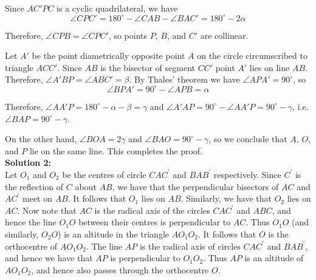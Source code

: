 \documentclass[a4paper, 12pt]{article}
\begin{document}
\begin{enumerate}
	Since $AC'PC$ is a cyclic quadrilateral, we have
	$$ \angle CPC' = 180^\circ - \angle CAB - \angle BAC' = 180^\circ - 2 \alpha $$
	
	Therefore, $\angle CPB = \angle CPC'$, so points $P$, $B$, and $C'$ are collinear.
	
	Let $A'$ be the point diametrically opposite point $A$ on the circle circumscribed to triangle $ACC'$. Since $AB$ is the bisector of segment $\overline{CC'}$ point $A'$ lies on line $AB$. Therefore, $\angle A'BP = \angle ABC' = \beta$. By Thales' theorem we have $\angle APA' = 90^\circ$, so
	$$ \angle BPA' = 90^\circ - \angle APB = \alpha $$
	
	Therefore, $\angle AA'P = 180^\circ - \alpha - \beta = \gamma$ and $\angle A'AP = 90^\circ - \angle AA'P = 90^\circ - \gamma$, i.e. $\angle BAP = 90^\circ - \gamma$.
	
	On the other hand, $\angle BOA = 2\gamma$ and $\angle BAO = 90^\circ - \gamma$, so we conclude that $A$, $O$, and $P$ lie on the same line. This completes the proof. \\

\textbf{Solution 2:} \\
    Let $O_1$ and $O_2$ be the centres of circle $CAC^\prime$ and $BAB^\prime$
    respectively. Since $C^\prime$ is the reflection of $C$ about $AB$, we have
    that the perpendicular bisectors of $AC$ and $AC^\prime$ meet on $AB$. It
    follows that $O_1$ lies on $AB$. Similarly, we have that $O_2$ lies on $AC$.
    Now note that $AC$ is the radical axis of the circles $CAC^\prime$ and
    $ABC$, and hence the line $O_1 O$ between their centres is perpendicular to
    $AC$. Thus $O_1 O$ (and similarly, $O_2 O$) is an altitude in the triangle
    $AO_1 O_2$. It follows that $O$ is the orthocentre of $AO_1 O_2$. The line
    $AP$ is the radical axis of circles $CAC^\prime$ and $BAB^\prime$, and hence
    we have that $AP$ is perpendicular to $O_1 O_2$. Thus $AP$ is an altitude of
    $AO_1 O_2$, and hence also passes through the orthocentre $O$.
	
\end{enumerate}
\end{document}

